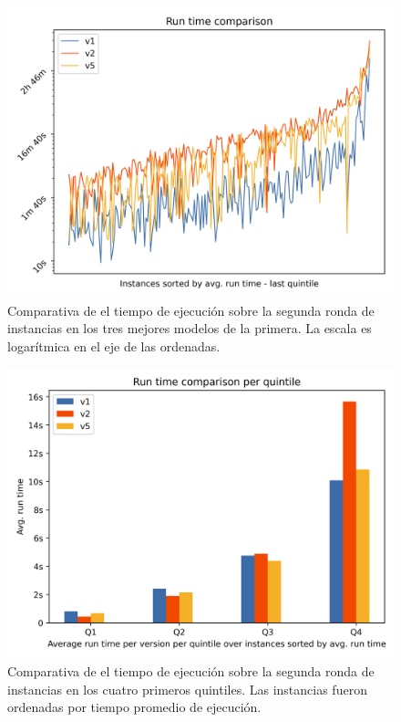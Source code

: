 \documentclass{article}
\begin{document}
  \begin{figure}[h!]
    \centering
    \includegraphics[width=12cm]{../resources/run_time_comparsion_rerun.png}
    \caption{Comparativa de el tiempo de ejecución sobre la segunda ronda de instancias en los tres mejores modelos de la primera. La escala es logarítmica en el eje de las ordenadas.} \label{fig:runtimecomparisonrerun}
  \end{figure}

  \begin{figure}[h!]
    \centering
    \includegraphics[width=12cm]{../resources/run_time_comparsion_by_quintile_rerun.png}
    \caption{Comparativa de el tiempo de ejecución sobre la segunda ronda de instancias en los cuatro primeros quintiles. Las instancias fueron ordenadas por tiempo promedio de ejecución.} \label{fig:firstfourquintilesrerun}
  \end{figure}
\end{document}
